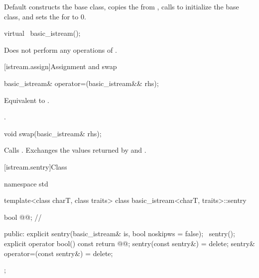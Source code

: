 \begin{itemdescr}
\pnum
\effects
Default constructs the base class, copies the
 from , calls
 to initialize the base
class, and sets the  for  to 0.
\end{itemdescr}

%
\begin{itemdecl}
virtual ~basic_istream();
\end{itemdecl}

\begin{itemdescr}
\pnum
\remarks
Does not perform any operations of
.
\end{itemdescr}

[istream.assign]{Assignment and swap}

%
\begin{itemdecl}
basic_istream& operator=(basic_istream&& rhs);
\end{itemdecl}

\begin{itemdescr}
\pnum
\effects
Equivalent to .

\pnum
\returns
{}.
\end{itemdescr}

%
\begin{itemdecl}
void swap(basic_istream& rhs);
\end{itemdecl}

\begin{itemdescr}
\pnum
\effects
Calls .
Exchanges the values returned by  and
.
\end{itemdescr}

[istream.sentry]{Class }

%
%
\begin{codeblock}
namespace std {
  template<class charT, class traits>
  class basic_istream<charT, traits>::sentry {
    bool @@;                   // \expos

  public:
    explicit sentry(basic_istream& is, bool noskipws = false);
    ~sentry();
    explicit operator bool() const { return @@; }
    sentry(const sentry&) = delete;
    sentry& operator=(const sentry&) = delete;
  };
}
\end{codeblock}

